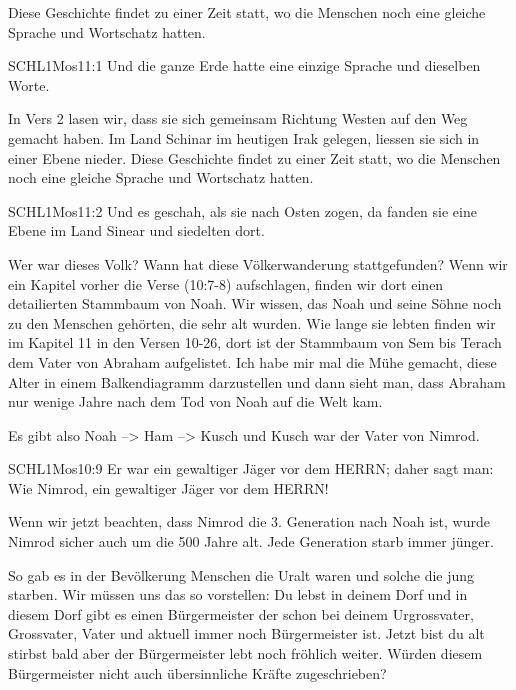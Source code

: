 \documentclass[14pt]{../../inc/mybib}
\newenvironment{block}[1][]{%
  \vspace{1.5em}%
  \noindent\textbf{#1}\par%
  \vspace{0.0em}%
}{%
  \vspace{1em}%
}
\begin{document}
    \vspace{1em}
    \begin{block}
    Diese Geschichte findet zu einer Zeit statt, wo die Menschen noch eine gleiche Sprache und Wortschatz hatten.
    \begin{bibelbox}{SCHL}{1Mos}{11:1}
        Und die ganze Erde hatte eine einzige Sprache und dieselben Worte.
    \end{bibelbox}    
    In Vers 2 lasen wir, dass sie sich gemeinsam Richtung Westen auf den Weg gemacht haben. Im Land Schinar im heutigen Irak gelegen, liessen sie sich in einer Ebene nieder.
    Diese Geschichte findet zu einer Zeit statt, wo die Menschen noch eine gleiche Sprache und Wortschatz hatten.
    \begin{bibelbox}{SCHL}{1Mos}{11:2}
        Und es geschah, als sie nach Osten zogen, da fanden sie eine Ebene im Land Sinear und siedelten dort.
    \end{bibelbox}
    Wer war dieses Volk? Wann hat diese Völkerwanderung stattgefunden? Wenn wir ein Kapitel vorher die Verse   (10:7-8) aufschlagen, finden wir dort einen detailierten Stammbaum von Noah. Wir wissen, das Noah und seine Söhne noch zu den Menschen gehörten, die sehr alt wurden. Wie lange sie lebten finden wir im Kapitel 11 in den Versen 10-26, dort ist der Stammbaum von Sem bis Terach dem Vater von Abraham aufgelistet. Ich habe mir mal die Mühe gemacht, diese Alter in einem Balkendiagramm darzustellen und dann sieht man, dass Abraham nur wenige Jahre nach dem Tod von Noah auf die Welt kam. 

    
    
    Es gibt also Noah --> Ham --> Kusch und Kusch war der Vater von Nimrod.
    \begin{bibelbox}{SCHL}{1Mos}{10:9}
        Er war ein gewaltiger Jäger vor dem HERRN; daher sagt man: Wie Nimrod, ein gewaltiger Jäger vor dem HERRN!
    \end{bibelbox}
    Wenn wir jetzt beachten, dass Nimrod die 3. Generation nach Noah ist, wurde Nimrod sicher auch um die 500 Jahre alt. Jede Generation starb immer jünger. 
\end{block}
\begin{block}
    So gab es in der Bevölkerung Menschen die Uralt waren und solche die jung starben. Wir müssen uns das so vorstellen:  Du lebst in deinem Dorf und in diesem Dorf gibt es einen Bürgermeister der schon bei deinem Urgrossvater, Grossvater, Vater und aktuell immer noch Bürgermeister ist. Jetzt bist du alt stirbst bald aber der Bürgermeister lebt noch fröhlich weiter. Würden diesem Bürgermeister nicht auch übersinnliche Kräfte zugeschrieben? 
\end{block}
\end{document}

